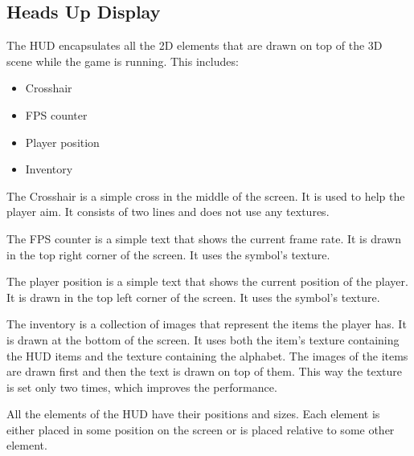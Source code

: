 \subsection{Heads Up Display} \label{sec:hud}
The HUD encapsulates all the 2D elements that are drawn on top of the 3D scene while the game is running.
This includes:
\begin{itemize}
    \item Crosshair
    \item FPS counter
    \item Player position
    \item Inventory
\end{itemize}

The Crosshair is a simple cross in the middle of the screen.
It is used to help the player aim.
It consists of two lines and does not use any textures.

The FPS counter is a simple text that shows the current frame rate.
It is drawn in the top right corner of the screen.
It uses the symbol's texture.

The player position is a simple text that shows the current position of the player.
It is drawn in the top left corner of the screen.
It uses the symbol's texture.

The inventory is a collection of images that represent the items the player has.
It is drawn at the bottom of the screen.
It uses both the item's texture containing the HUD items and the texture containing the alphabet.
The images of the items are drawn first and then the text is drawn on top of them.
This way the texture is set only two times, which improves the performance.

All the elements of the HUD have their positions and sizes.
Each element is either placed in some position on the screen or is placed relative to some other element.